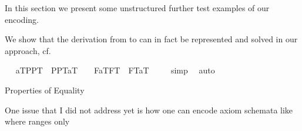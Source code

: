 \begin{isabellebody}
\isamarkuptrue%
%
\isamarkuptrue%
%
\begin{isamarkuptext}%
In this section we present some unstructured further test examples of our encoding.%
\end{isamarkuptext}%
\isamarkuptrue%
%
\begin{isamarkuptext}%
We show that the derivation from  
to  can in fact be 
represented and solved in our approach, 
cf. ~\cite[chap.4]{zalta11:_relat_versus_funct_found_logic}%
\end{isamarkuptext}%
\isamarkuptrue%
\ \isamarkupfalse%
\ {\isachardoublequoteopen}{\isacharbrackleft}{\isacharparenleft}{\isasymlbrace}a\isactrlsup T{\isacharcomma}PP\isactrlsup T{\isasymrbrace}\ \isactrlbold {\isasymand}\ \isactrlbold {\isasymnot}{\isasymlparr}PP\isactrlsup T{\isacharcomma}a\isactrlsup T{\isasymrparr}{\isacharparenright}{\isacharbrackright}\ {\isacharequal}\ {\isasymtop}\ {\isasymlongrightarrow}\ {\isacharbrackleft}{\isacharparenleft}\isactrlbold {\isasymexists}F{\isachardot}{\isasymlbrace}a\isactrlsup T{\isacharcomma}F\isactrlsup T{\isasymrbrace}\ \isactrlbold {\isasymand}\ \isactrlbold {\isasymnot}{\isasymlparr}F\isactrlsup T{\isacharcomma}a\isactrlsup T{\isasymrparr}{\isacharparenright}{\isacharbrackright}\ {\isacharequal}\ {\isasymtop}{\isachardoublequoteclose}%
\isadelimproof
\ %
\endisadelimproof
%
\isatagproof
{}\isamarkupfalse%
\ simp\ \isamarkupfalse%
\ auto%
\endisatagproof
{\isafoldproof}%
%
\isadelimproof
%
\endisadelimproof
%
\begin{isamarkuptext}%
Properties of Equality%
\end{isamarkuptext}%
\isamarkuptrue%
%
\isamarkuptrue%
%
\begin{isamarkuptext}%
One issue that I did not address yet is how one can encode 
 axiom schemata like \isa{\isactrlbold {\isasymA}{\isasymphi}\ \isactrlbold {\isasymrightarrow}\ \isactrlbold {\isasymphi}} where \isa{\isactrlbold {\isasymphi}} ranges only 

\end{isamarkuptext}
\end{isabellebody}
